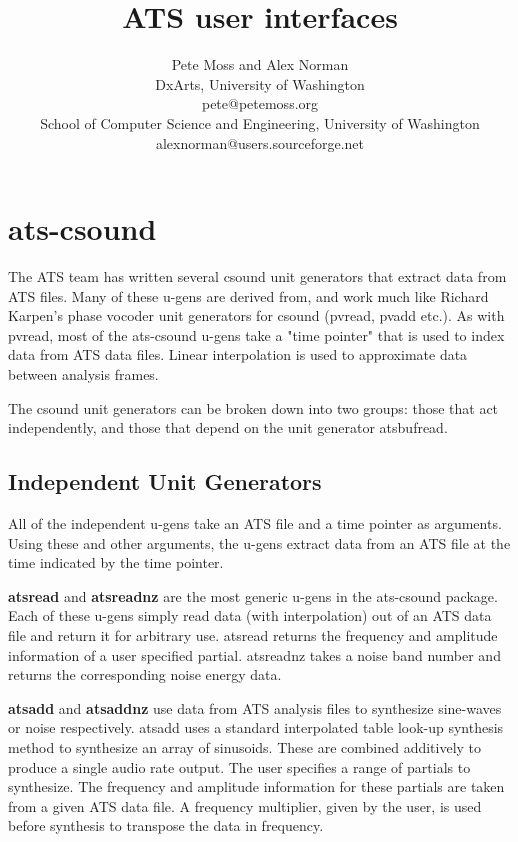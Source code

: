 \documentclass[10pt,letterpaper]{article}
\begin{document}
\twocolumn

\title{\textbf{ATS user interfaces}}
\author{
Pete Moss and Alex Norman\\
DxArts, University of Washington\\
pete@petemoss.org\\
School of Computer Science and Engineering, University of Washington\\
alexnorman@users.sourceforge.net\\
}
\date{}     %
\maketitle

\pagestyle{empty}          %
\thispagestyle{empty}      %


\section{ats-csound}
The ATS team has written several csound unit generators that extract data from ATS files.  Many of these u-gens are derived from, and work much like Richard Karpen's phase vocoder unit generators for csound (pvread, pvadd etc.).  As with pvread, most of the ats-csound u-gens take a "time pointer" that is used to index data from ATS data files.  Linear interpolation is used to approximate data between analysis frames.

The csound unit generators can be broken down into two groups: those that act independently, and those that depend on the unit generator atsbufread.

\subsection{Independent Unit Generators}
All of the independent u-gens take an ATS file and a time pointer as arguments.  Using these and other arguments, the u-gens extract data from an ATS file at the time indicated by the time pointer.

\textbf{atsread} and \textbf{atsreadnz} are the most generic u-gens in the ats-csound package.  Each of these u-gens simply read data (with interpolation) out of an ATS data file and return it for arbitrary use.  atsread returns the frequency and amplitude information of a user specified partial.  atsreadnz takes a noise band number and returns the corresponding noise energy data.

\textbf{atsadd} and \textbf{atsaddnz} use data from ATS analysis files to synthesize sine-waves or noise respectively.  atsadd uses a standard interpolated table look-up synthesis method to synthesize an array of sinusoids.  These are combined additively to produce a single audio rate output.  The user specifies a range of partials to synthesize.  The frequency and amplitude information for these partials are taken from a given ATS data file.  A frequency multiplier, given by the user, is used before synthesis to transpose the data in frequency.
\end{document}
